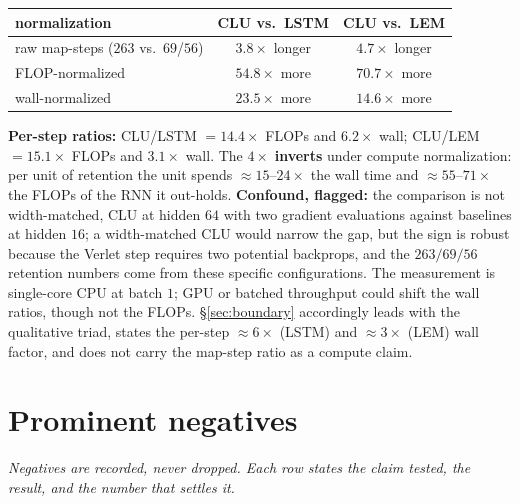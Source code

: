 \documentclass{article}
\begin{document}
\begin{center}
\begin{tabular}{lcc}
\toprule
normalization & CLU vs.\ LSTM & CLU vs.\ LEM \\
\midrule
raw map-steps ($263$ vs.\ $69$/$56$) & $3.8\times$ longer & $4.7\times$ longer \\
FLOP-normalized & $\mathbf{54.8\times}$ more & $\mathbf{70.7\times}$ more \\
wall-normalized & $\mathbf{23.5\times}$ more & $\mathbf{14.6\times}$ more \\
\bottomrule
\end{tabular}
\end{center}

\textbf{Per-step ratios:} CLU/LSTM $=14.4\times$ FLOPs and $6.2\times$ wall; CLU/LEM $=15.1\times$ FLOPs and $3.1\times$ wall. The $4\times$ \textbf{inverts} under compute normalization: per unit of retention the unit spends $\approx15$--$24\times$ the wall time and $\approx55$--$71\times$ the FLOPs of the RNN it out-holds. \textbf{Confound, flagged:} the comparison is not width-matched, CLU at hidden $64$ with two gradient evaluations against baselines at hidden $16$; a width-matched CLU would narrow the gap, but the sign is robust because the Verlet step requires two potential backprops, and the $263/69/56$ retention numbers come from these specific configurations. The measurement is single-core CPU at batch $1$; GPU or batched throughput could shift the wall ratios, though not the FLOPs. \S\ref{sec:boundary} accordingly leads with the qualitative triad, states the per-step $\approx6\times$ (LSTM) and $\approx3\times$ (LEM) wall factor, and does not carry the map-step ratio as a compute claim.

\section{Prominent negatives}\label{app:neg}

\emph{Negatives are recorded, never dropped. Each row states the claim tested, the result, and the number that settles it.}
\end{document}
